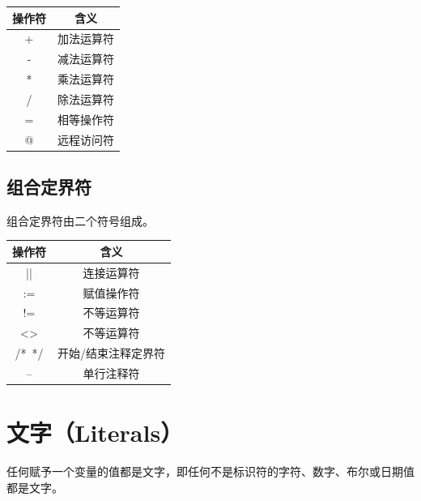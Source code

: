 \documentclass[11pt, a4paper, oneside, UTF8]{ctexbook}
\begin{document}
\begin{center}
  \begin{minipage}{\textwidth}
    \centering %
    \begin{tabular}{|c|c|} %
      \hline %
      \textbf{操作符} & \textbf{含义}  \\
      \hline
      + & 加法运算符  \\
      - & 减法运算符  \\
      * & 乘法运算符  \\
      / & 除法运算符  \\
      = & 相等操作符  \\
      @ & 远程访问符  \\
      \hline
    \end{tabular}
    \captionsetup{hypcap=false}
    \label{tab:简单定界符} %
  \end{minipage}
\end{center}

\subsection{组合定界符}
组合定界符由二个符号组成。

\begin{center}
  \begin{minipage}{\textwidth}
    \centering %
    \begin{tabular}{|c|c|} %
      \hline %
      \textbf{操作符} & \textbf{含义}  \\
      \hline
      ||  & 连接运算符  \\
      := & 赋值操作符  \\
      !=  & 不等运算符  \\
      <> & 不等运算符  \\
      /*\ */ & 开始/结束注释定界符  \\
      --  & 单行注释符  \\
      \hline
    \end{tabular}
    \captionsetup{hypcap=false}
    \label{tab:组合定界符} %
  \end{minipage}
\end{center}

\section{文字（Literals）}
任何赋予一个变量的值都是文字，即任何不是标识符的字符、数字、布尔或日期值都是文字。
\end{document}
